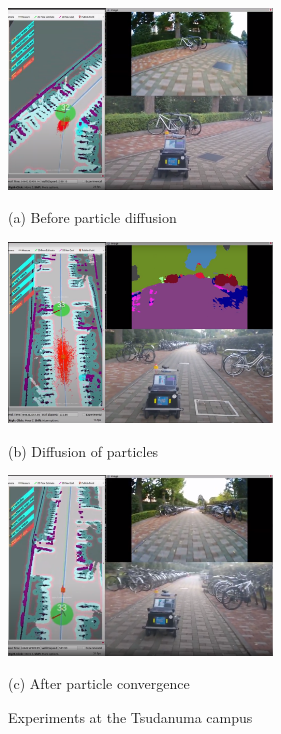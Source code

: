 \documentclass[uplatex, twocolumn, 9pt]{jsproceedings}
\begin{document}
\begin{figure}[h]
  \centering
  \begin{minipage}[b]{1\linewidth}
    \centering
    \includegraphics[width=70mm]{fig/switch-mode1.pdf}
    \caption*{(a) Before particle diffusion}
  \end{minipage} 
  \hspace{0.03\columnwidth}
  \begin{minipage}[b]{1\linewidth}
    \centering
    \includegraphics[width=70mm]{fig/switch-mode2.pdf}
    \caption*{(b) Diffusion of particles}
  \end{minipage}
  \begin{minipage}[b]{1\linewidth}
    \centering
    \includegraphics[width=70mm]{fig/switch-mode3.pdf}
    \caption*{(c) After particle convergence}
  \end{minipage}
  \caption{Experiments at the Tsudanuma campus}
  \label{fig:switch-mode}%
\end{figure}

\end{document}
